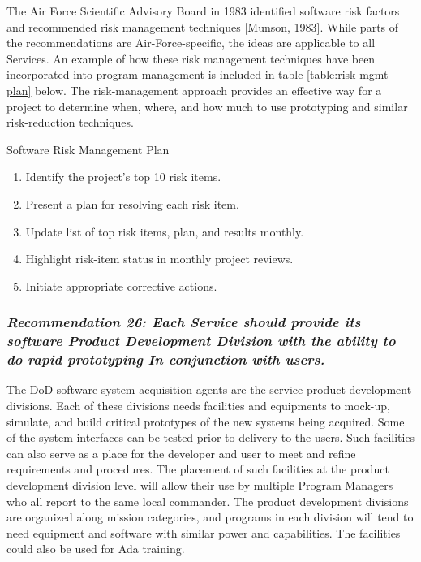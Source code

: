 \documentclass[12pt,final]{article}
\begin{document}
The Air Force Scientific Advisory Board in 1983 identified software risk
factors and recommended risk management techniques [Munson, 1983]. While parts
of the recommendations are Air-Force-specific, the ideas are applicable to all
Services. An example of how these risk management techniques have been
incorporated into program management is included in table
\ref{table:risk-mgmt-plan} below. The risk-management approach provides an
effective way for a project to determine when, where, and how much to use
prototyping and similar risk-reduction techniques.

\addtocounter{section}{-1}

\begin{table}[hb]
    \caption{Software Risk Management Plan}
    \label{table:risk-mgmt-plan}
\begin{enumerate}
    \item Identify the project’s top 10 risk items.
    \item Present a plan for resolving each risk item.
    \item Update list of top risk items, plan, and results monthly.
    \item Highlight risk-item status in monthly project reviews.
    \item Initiate appropriate corrective actions.
\end{enumerate}
\end{table}


\subsubsection*{\textit{Recommendation 26: Each Service should provide its
software Product Development Division with the ability to do rapid prototyping
In conjunction with users.}}

The DoD software system acquisition agents are the service product development
divisions. Each of these divisions needs facilities and equipments to mock-up,
simulate, and build critical prototypes of the new systems being acquired. Some
of the system interfaces can be tested prior to delivery to the users. Such
facilities can also serve as a place for the developer and user to meet and
refine requirements and procedures. The placement of such facilities at the
product development division level will allow their use by multiple Program
Managers who all report to the same local commander. The product development
divisions are organized along mission categories, and programs in each division
will tend to need equipment and software with similar power and capabilities.
The facilities could also be used for Ada training.
\end{document}
